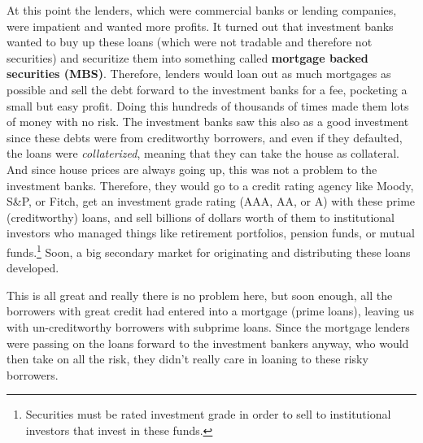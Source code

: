 \documentclass{article}
\begin{document}
  At this point the lenders, which were commercial banks or lending companies, were impatient and wanted more profits. It turned out that investment banks wanted to buy up these loans (which were not tradable and therefore not securities) and securitize them into something called \textbf{mortgage backed securities (MBS)}. Therefore, lenders would loan out as much mortgages as possible and sell the debt forward to the investment banks for a fee, pocketing a small but easy profit. Doing this hundreds of thousands of times made them lots of money with no risk. The investment banks saw this also as a good investment since these debts were from creditworthy borrowers, and even if they defaulted, the loans were \textit{collaterized}, meaning that they can take the house as collateral. And since house prices are always going up, this was not a problem to the investment banks. Therefore, they would go to a credit rating agency like Moody, S\&P, or Fitch, get an investment grade rating (AAA, AA, or A) with these prime (creditworthy) loans, and sell billions of dollars worth of them to institutional investors who managed things like retirement portfolios, pension funds, or mutual funds.\footnote{Securities must be rated investment grade in order to sell to institutional investors that invest in these funds. } Soon, a big secondary market for originating and distributing these loans developed. 

  This is all great and really there is no problem here, but soon enough, all the borrowers with great credit had entered into a mortgage (prime loans), leaving us with un-creditworthy borrowers with subprime loans. Since the mortgage lenders were passing on the loans forward to the investment bankers anyway, who would then take on all the risk, they didn't really care in loaning to these risky borrowers. 
\end{document}
